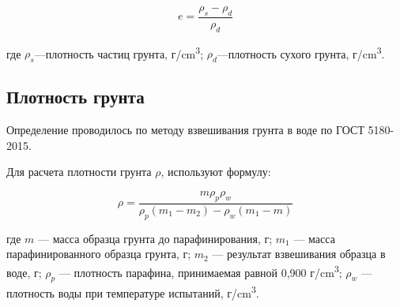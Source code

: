 \[
   \textit{e} = \frac{\rho_s-\rho_d}{\rho_d}
\]

где $\rho_s$---плотность частиц грунта, г/\si{\centi\meter^3};
$\rho_d$---плотность сухого грунта, г/\si{\centi\meter^3}.

\subsection{Плотность грунта}

Определение проводилось по методу взвешивания грунта в воде по ГОСТ 5180-2015. 

Для расчета плотности грунта  $\rho$,  используют формулу: 

\[
   \rho = \frac{m \rho_p \rho_w}{\rho_p (m_1-m_2)-\rho_w (m_1-m)}
\]

где $m$ --- масса образца грунта до парафинирования, г;
$m_1$ --- масса парафинированного образца грунта, г;
$m_2$ --- результат взвешивания образца в воде, г; 
$\rho_p$ --- плотность парафина, принимаемая равной 0,900 г/\si{\centi\meter^3};
$\rho_w$ --- плотность воды при температуре испытаний,  г/\si{\centi\meter^3}.


